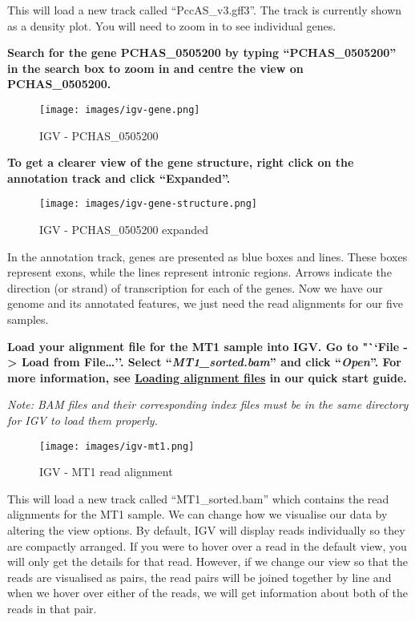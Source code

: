 \documentclass[11pt]{article}
\begin{document}
This will load a new track called ``PccAS\_v3.gff3''. The track is
currently shown as a density plot. You will need to zoom in to see
individual genes.

\textbf{Search for the gene PCHAS\_0505200 by typing ``PCHAS\_0505200''
in the search box to zoom in and centre the view on PCHAS\_0505200.}

    \begin{figure}[!h]
\centering
\texttt{[image: images/igv-gene.png]}
\caption{IGV - PCHAS\_0505200}
\end{figure}

    \textbf{To get a clearer view of the gene structure, right click on the
annotation track and click ``Expanded''.}

    \begin{figure}[!h]
\centering
\texttt{[image: images/igv-gene-structure.png]}
\caption{IGV - PCHAS\_0505200 expanded}
\end{figure}

    In the annotation track, genes are presented as blue boxes and lines.
These boxes represent exons, while the lines represent intronic regions.
Arrows indicate the direction (or strand) of transcription for each of
the genes. Now we have our genome and its annotated features, we just
need the read alignments for our five samples.

\textbf{Load your alignment file for the MT1 sample into IGV. Go to
"``File -\textgreater{} Load from File\ldots{}''. Select
``\textit{MT1\_sorted.bam}'' and click ``\textit{Open}''. For more
information, see
\href{https://github.com/sanger-pathogens/pathogen-informatics-training/blob/master/Notebooks/IGV/index.ipynb}{Loading
alignment files} in our quick start guide.}

\textit{Note: BAM files and their corresponding index files must be in the
same directory for IGV to load them properly.}

    \begin{figure}[!h]
\centering
\texttt{[image: images/igv-mt1.png]}
\caption{IGV - MT1 read alignment}
\end{figure}

    This will load a new track called ``MT1\_sorted.bam'' which contains the
read alignments for the MT1 sample. We can change how we visualise our
data by altering the view options. By default, IGV will display reads
individually so they are compactly arranged. If you were to hover over a
read in the default view, you will only get the details for that read.
However, if we change our view so that the reads are visualised as
pairs, the read pairs will be joined together by line and when we hover
over either of the reads, we will get information about both of the
reads in that pair.
\end{document}
